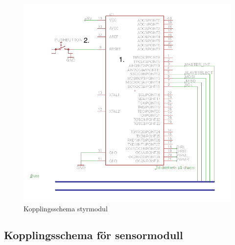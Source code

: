 \documentclass[a4paper,12pt,fleqn]{article}
\begin{document}
\begin{figure}[ht] %
  \begin{center}
  \includegraphics[keepaspectratio=true,width=\linewidth]{bilder/kopplingsschema_styrmodul.png}  %
  \end{center}
  \caption{Kopplingsschema styrmodul} %
  \label{fig:kopplingstyr} %
\end{figure}
 \clearpage %
 

\subsection*{Kopplingsschema för sensormodull}
\end{document}
